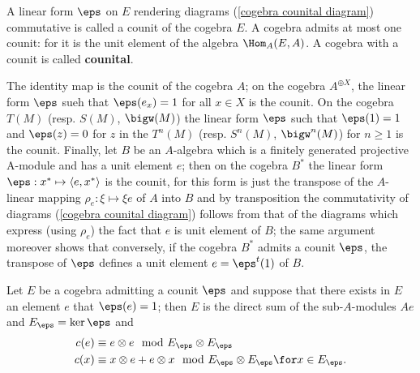 A linear form $\eps$ on $E$ rendering diagrams (\ref{cogebra counital diagram}) commutative is called a counit of the cogebra $E$. A cogebra admits at most one counit: for it is the unit element of the algebra $\Hom_A(E,A)$. A cogebra with a counit is called \textbf{counital}.
\begin{example}
The identity map is the counit of the cogebra $A$; on the cogebra $A^{\oplus X}$, the linear form $\eps$ sueh that $\eps(e_x)=1$ for all $x\in X$ is the counit. On the cogebra $T(M)$ (resp. $S(M)$, $\bigw(M)$) the linear form $\eps$ such that $\eps(1)=1$ and $\eps(z)=0$ for $z$ in the $T^n(M)$ (resp. $S^n(M)$, $\bigw^n(M)$) for $n\geq 1$ is the counit. Finally, let $B$ be an $A$-algebra which is a finitely generated projective A-module and has a unit element $e$; then on the cogebra $B^*$ the linear form $\eps:x^*\mapsto\langle e,x^*\rangle$ is the counit, for this form is just the transpose of the $A$-linear mapping $\rho_e:\xi\mapsto\xi e$ of $A$ into $B$ and by transposition the commutativity of diagrams (\ref{cogebra counital diagram}) follows from that of the diagrams which express (using $\rho_e$) the fact that $e$ is unit element of $B$; the same argument moreover shows that conversely, if the cogebra $B^*$ admits a counit $\eps$, the transpose of $\eps$ defines a unit element $e=\eps^t(1)$ of $B$.
\end{example}
\begin{proposition}\label{cogebra counit image 1 mod relation}
Let $E$ be a cogebra admitting a counit $\eps$ and suppose that there exists in $E$ an element $e$ that $\eps(e)=1$; then $E$ is the direct sum of the sub-$A$-modules $Ae$ and $E_\eps=\ker\eps$ and
\begin{equation}\label{cogebra counit image 1 mod relation-1}
\begin{aligned}
c(e)&\equiv e\otimes e\mod E_\eps\otimes E_\eps\\
c(x)&\equiv x\otimes e+e\otimes x\mod E_\eps\otimes E_\eps\for x\in E_\eps.
\end{aligned}
\end{equation}
\end{proposition}
